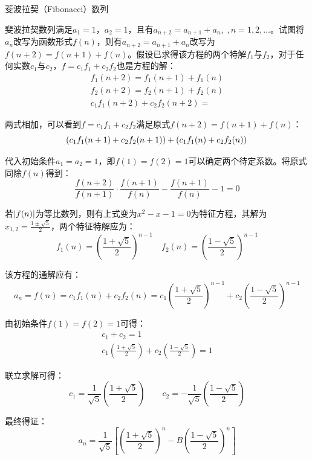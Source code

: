 \documentclass[11pt]{article}
\begin{document}
\begin{example}
    斐波拉契（Fibonacci）数列

    斐波拉契数列满足$a_1=1$，$a_2=1$，且有$a_{n+2} = a_{n+1} + a_{n},\;,n=1,2,\dots$。试图将$a_n$改写为函数形式$f(n)$，则有$a_{n+2} = a_{n+1} + a_{n}$改写为$f(n+2) = f(n+1) + f(n)$。假设已求得该方程的两个特解$f_1$与$f_2$，对于任何实数$c_1$与$c_2$，$f= c_1 f_1 + c_2 f_2$也是方程的解：
    \begin{gather*}
        f_1(n+2) = f_1(n+1) + f_1(n) \\
        f_2(n+2) = f_2(n+1) + f_2(n) \\
        c_1 f_1(n+2) + c_2 f_2(n+2) = 
    \end{gather*}

    两式相加，可以看到$f = c_1 f_1 + c_2 f_2$满足原式$f(n+2) = f(n+1) + f(n)$：
    \begin{equation*}
        \left( c_1 f_1(n+1) + c_2 f_2(n+1) \right) + \left( c_1 f_1(n)  + c_2 f_2(n) \right) \\
    \end{equation*}

    代入初始条件$a_1=a_2=1$，即$f(1)=f(2)=1$可以确定两个待定系数。将原式同除$f(n)$得到：
    \begin{equation*}
        \frac{f(n+2)}{f(n+1)} \cdot \frac{f(n+1)}{f(n)} - \frac{f(n+1)}{f(n)} - 1 = 0
    \end{equation*}

    若$\left\lvert f(n)\right\rvert$为等比数列，则有上式变为$x^2-x-1=0$为特征方程，其解为$x_{1,2} = \frac{1\pm \sqrt{5}}{2}$，两个特征特解应为：
    \begin{equation*}
        f_1(n) = \left(\frac{1+\sqrt{5}}{2}\right)^{n-1} \quad
        f_2(n) = \left(\frac{1-\sqrt{5}}{2}\right)^{n-1}
    \end{equation*}
   
    该方程的通解应有：
    \begin{equation*}
        a_n = f(n) = c_1 f_1(n) + c_2 f_2(n) = 
        c_1 \left(\frac{1+\sqrt{5}}{2} \right)^{n-1} + c_2 \left( \frac{1-\sqrt{5}}{2} \right)^{n-1}
    \end{equation*}
    
    由初始条件$f(1)=f(2)=1$可得：
    \begin{gather*}
        c_1 + c_2 = 1 \\
        c_1 \left(\frac{1+\sqrt{5}}{2} \right) + c_2 \left( \frac{1-\sqrt{5}}{2} \right) = 1
    \end{gather*}
    
    联立求解可得：
    \begin{equation*}
        c_1 = \frac{1}{\sqrt{5}} \left(\frac{1+\sqrt{5}}{2} \right) \qquad
        c_2 = - \frac{1}{\sqrt{5}} \left(\frac{1-\sqrt{5}}{2} \right)
    \end{equation*}
    
    最终得证：
    \begin{equation*}
        a_n = \frac{1}{\sqrt{5}} \left[ \left(\frac{1+\sqrt{5}}{2} \right)^n - B\left( \frac{1-\sqrt{5}}{2} \right)^n \right]
    \end{equation*}
\end{example}
\end{document}
